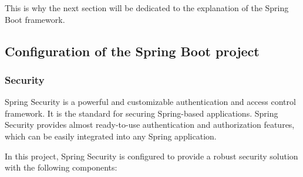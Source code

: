 This is why the next section will be dedicated to the explanation of the Spring Boot framework.

\subsection{Configuration of the Spring Boot project}\label{subsec:configuration-of-the-spring-boot-project}

\subsubsection{Security}
Spring Security is a powerful and customizable authentication and access control framework.
It is the standard for securing Spring-based applications.
Spring Security provides almost ready-to-use authentication and authorization features, which can be easily integrated into any Spring application.

In this project, Spring Security is configured to provide a robust security solution with the following components:

